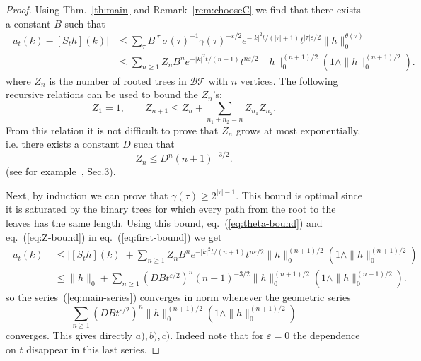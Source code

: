 \documentclass[a4paper,12pt,reqno]{amsart}
\newcommand{\1}{{\bf 1}}
\newcommand{\eps}{\varepsilon}
\newcommand{\BT}{\mathcal{BT}}
\begin{document}
\begin{proof}
Using Thm.~\ref{th:main} and Remark~\ref{rem:chooseC} we find that there exists a constant $B$ such that
\begin{equation}
\label{eq:first-bound}
  \begin{split}
|u_t(k) - [S_t h](k)|& \le \sum_{\tau} B^{|\tau|} \sigma(\tau)^{-1} \gamma(\tau)^{-\eps/2}  
  e^{-|k|^2 t / (|\tau|+1)}
t^{|\tau| \eps /2} \|h\|_0^{\theta(\tau)} 
\\ & \le \sum_{n \ge 1} Z_n B^n
e^{-|k|^2 t/(n+1)} t^{n \eps/2} \|h\|_0^{(n+1)/2} \left(1 \wedge \|h\|_0^{(n+1)/2} \right).      
  \end{split}
\end{equation}
where $Z_n$ is the number of rooted trees in $\BT$ with $n$ vertices.
The following recursive relations can be used to bound the $Z_n$'s:
$$
Z_1 = 1, \qquad Z_{n+1} \le Z_n +  \sum_{n_1+n_2 = n} Z_{n_1} Z_{n_2}.
$$
From this relation it is not difficult to prove that $Z_n$ grows at most exponentially, i.e. there exists a constant $D$ such that
\begin{equation}
  \label{eq:Z-bound}
Z_n \le D^n (n+1)^{-3/2}.  
\end{equation}
(see for example~\cite{Sinai2}, Sec.3).

Next, by induction we can prove that $\gamma(\tau) \ge 2^{|\tau|-1}$. This bound is optimal since it is saturated by the binary trees for which every path from the root to the leaves has the same length.
Using this bound, eq.~(\ref{eq:theta-bound}) and eq.~(\ref{eq:Z-bound}) in eq.~(\ref{eq:first-bound}) we get
\begin{equation}
\label{eq:first-bound-2}
  \begin{split}
|u_t(k)| & \le  |[S_t h](k)|+  \sum_{n \ge 1} Z_n B^n
e^{-|k|^2 t/(n+1)} t^{n \eps/2} \|h\|_0^{(n+1)/2} \left(1 \wedge \|h\|_0^{(n+1)/2} \right)
\\ & \le  \|h\|_0 +  \sum_{n \ge 1}  (DB t^{\eps/2})^n (n+1)^{-3/2}
 \|h\|_0^{(n+1)/2} \left(1 \wedge \|h\|_0^{(n+1)/2} \right).       
  \end{split}
\end{equation}
so the series~(\ref{eq:main-series}) converges in norm whenever the geometric series
$$
 \sum_{n \ge 1}  (DB t^{\eps/2})^n 
 \|h\|_0^{(n+1)/2} \left(1 \wedge \|h\|_0^{(n+1)/2} \right)
$$
converges. This gives directly  $a),b),c)$. Indeed note that for $\eps = 0$ the dependence on $t$ disappear in this last series.
\end{proof}
\end{document}

